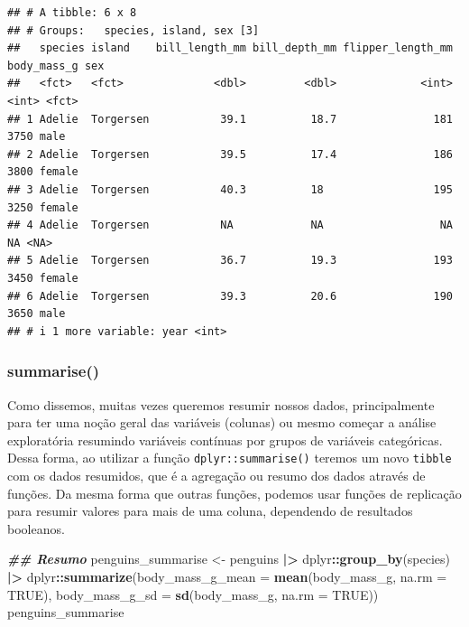 \documentclass[
]{article}
\newenvironment{Shaded}{\begin{snugshade}}{\end{snugshade}}
\newcommand{\AttributeTok}[1]{\textcolor[rgb]{0.13,0.29,0.53}{#1}}
\newcommand{\ConstantTok}[1]{\textcolor[rgb]{0.56,0.35,0.01}{#1}}
\newcommand{\DocumentationTok}[1]{\textcolor[rgb]{0.56,0.35,0.01}{\textbf{\textit{#1}}}}
\newcommand{\FunctionTok}[1]{\textcolor[rgb]{0.13,0.29,0.53}{\textbf{#1}}}
\newcommand{\NormalTok}[1]{#1}
\newcommand{\OtherTok}[1]{\textcolor[rgb]{0.56,0.35,0.01}{#1}}
\newcommand{\SpecialCharTok}[1]{\textcolor[rgb]{0.81,0.36,0.00}{\textbf{#1}}}
\begin{document}
\begin{verbatim}
## # A tibble: 6 x 8
## # Groups:   species, island, sex [3]
##   species island    bill_length_mm bill_depth_mm flipper_length_mm body_mass_g sex   
##   <fct>   <fct>              <dbl>         <dbl>             <int>       <int> <fct> 
## 1 Adelie  Torgersen           39.1          18.7               181        3750 male  
## 2 Adelie  Torgersen           39.5          17.4               186        3800 female
## 3 Adelie  Torgersen           40.3          18                 195        3250 female
## 4 Adelie  Torgersen           NA            NA                  NA          NA <NA>  
## 5 Adelie  Torgersen           36.7          19.3               193        3450 female
## 6 Adelie  Torgersen           39.3          20.6               190        3650 male  
## # i 1 more variable: year <int>
\end{verbatim}

\hypertarget{summarise}{%
\subsubsection{summarise()}\label{summarise}}

Como dissemos, muitas vezes queremos resumir nossos dados, principalmente para ter uma noção geral das variáveis (colunas) ou mesmo começar a análise exploratória resumindo variáveis contínuas por grupos de variáveis categóricas. Dessa forma, ao utilizar a função \texttt{dplyr::summarise()} teremos um novo \texttt{tibble} com os dados resumidos, que é a agregação ou resumo dos dados através de funções. Da mesma forma que outras funções, podemos usar funções de replicação para resumir valores para mais de uma coluna, dependendo de resultados booleanos.

\begin{Shaded}
\begin{Highlighting}[]
\DocumentationTok{\#\# Resumo}
\NormalTok{penguins\_summarise }\OtherTok{\textless{}{-}}\NormalTok{ penguins }\SpecialCharTok{|\textgreater{}} 
\NormalTok{    dplyr}\SpecialCharTok{::}\FunctionTok{group\_by}\NormalTok{(species) }\SpecialCharTok{|\textgreater{}} 
\NormalTok{    dplyr}\SpecialCharTok{::}\FunctionTok{summarize}\NormalTok{(}\AttributeTok{body\_mass\_g\_mean =} \FunctionTok{mean}\NormalTok{(body\_mass\_g, }\AttributeTok{na.rm =} \ConstantTok{TRUE}\NormalTok{),}
                     \AttributeTok{body\_mass\_g\_sd =} \FunctionTok{sd}\NormalTok{(body\_mass\_g, }\AttributeTok{na.rm =} \ConstantTok{TRUE}\NormalTok{))}
\NormalTok{penguins\_summarise}
\end{Highlighting}
\end{Shaded}
\end{document}
